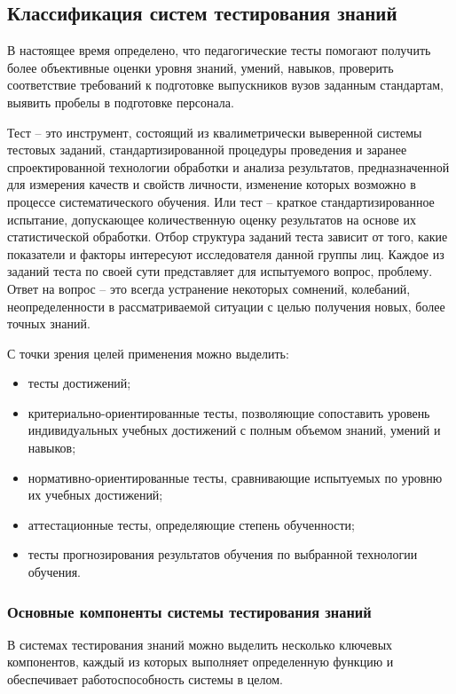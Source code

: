 \subsection{Классификация систем тестирования знаний}

В настоящее время определено, что педагогические тесты помогают
получить более объективные оценки уровня знаний, умений, навыков,
проверить соответствие требований к подготовке выпускников вузов заданным
стандартам, выявить пробелы в подготовке персонала.

Тест – это инструмент, состоящий из квалиметрически выверенной системы тестовых заданий, стандартизированной процедуры проведения и заранее спроектированной технологии обработки и анализа результатов, предназначенной для измерения качеств и свойств личности, изменение которых возможно в процессе систематического обучения. Или тест – краткое стандартизированное испытание, допускающее количественную оценку результатов на основе их
статистической обработки. Отбор структура заданий теста зависит от того, какие показатели и факторы интересуют исследователя данной группы лиц. Каждое из заданий теста по своей сути представляет для испытуемого вопрос, проблему. Ответ на вопрос – это всегда устранение некоторых сомнений, колебаний, неопределенности в рассматриваемой ситуации с целью получения новых, более точных знаний.

С точки зрения целей применения можно выделить:
\begin{itemize}
	\item тесты достижений;
	\item критериально-ориентированные тесты, позволяющие сопоставить
	уровень индивидуальных учебных достижений с полным объемом знаний,
	умений и навыков;
	\item нормативно-ориентированные тесты, сравнивающие испытуемых по
	уровню их учебных достижений;
	\item аттестационные тесты, определяющие степень обученности;
	\item тесты прогнозирования результатов обучения по выбранной
	технологии обучения.
\end{itemize}

\subsubsection{Основные компоненты системы тестирования знаний}

В системах тестирования знаний можно выделить несколько ключевых компонентов, каждый из которых выполняет определенную функцию и обеспечивает работоспособность системы в целом.

